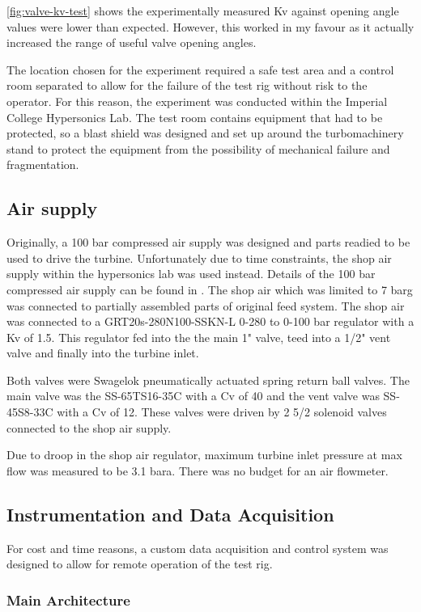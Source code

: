 \cref{fig:valve-kv-test} shows the experimentally measured Kv against opening angle values were lower than expected. However, this worked in my favour as it actually increased the range of useful valve opening angles.

The location chosen for the experiment required a safe test area and a control room separated to allow for the failure of the test rig without risk to the operator. For this reason, the experiment was conducted within the Imperial College Hypersonics Lab. The test room contains equipment that had to be protected, so a blast shield was designed and set up around the turbomachinery stand to protect the equipment from the possibility of mechanical failure and fragmentation.

\subsection{Air supply}

Originally, a 100 bar compressed air supply was designed and parts readied to be used to drive the turbine. Unfortunately due to time constraints, the shop air supply within the hypersonics lab was used instead. Details of the 100 bar compressed air supply can be found in . The shop air which was limited to 7 barg was connected to partially assembled parts of original feed system. The shop air was connected to a GRT20s-280N100-SSKN-L 0-280 to 0-100 bar regulator with a Kv of 1.5. This regulator fed into the the main 1" valve, teed into a 1/2" vent valve and finally into the turbine inlet.

Both valves were Swagelok pneumatically actuated spring return ball valves. The main valve was the  SS-65TS16-35C with a Cv of 40 and the vent valve was SS-45S8-33C with a Cv of 12. These valves were driven by 2 5/2 solenoid valves connected to the shop air supply.

Due to droop in the shop air regulator, maximum turbine inlet pressure at max flow was measured to be 3.1 bara. There was no budget for an air flowmeter.

\subsection{Instrumentation and Data Acquisition}

For cost and time reasons, a custom data acquisition and control system was designed to allow for remote operation of the test rig. 

\subsubsection{Main Architecture}

